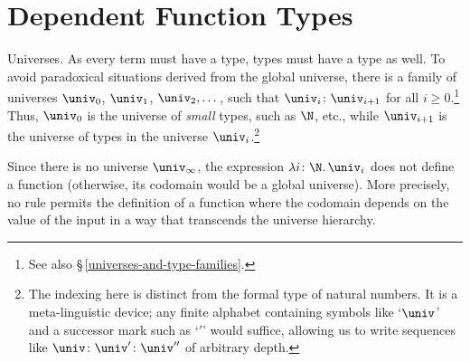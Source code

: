 \section{Dependent Function Types}

\begin{lpar}{Universes.}\label{lpar:universes}
    As every term must have a type, types must have a type as well. To avoid paradoxical situations derived from the global universe, there is a family of universes $\univ_0$, $\univ_1$, $\univ_2,\dots$, such that $\univ_i\colon\univ_{i+1}$ for all $i\ge0$.\footnote{See also \S\,\ref{universes-and-type-families}.} Thus, $\univ_0$ is the universe of \textsl{small} types, such as $\N$, etc., while $\univ_{i+1}$ is the universe of types in the universe $\univ_i$.\footnote{The indexing here is distinct from the formal type of natural numbers. It is a meta-linguistic device; any finite alphabet containing symbols like `$\univ$' and a successor mark such as `$'$' would suffice, allowing us to write sequences like $\univ\colon\univ'\colon\univ''$ of arbitrary depth.}

    Since there is no universe\/ $\univ_\infty$, the expression $\lambda i\colon\N.\,\univ_i$ does not define a function (otherwise, its codomain would be a global universe). More precisely, no rule permits the definition of a function where the codomain depends on the value of the input in a way that transcends the universe hierarchy.
\end{lpar}

